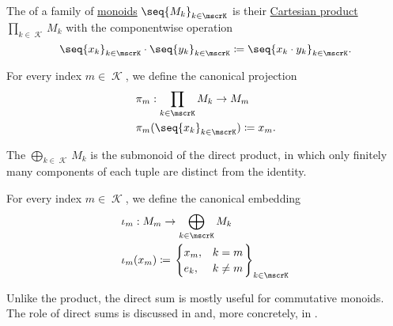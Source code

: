 \begin{definition}\label{def:monoid_direct_product}
  The  of a family of \hyperref[def:monoid]{monoids} \( \seq{ M_k }_{k \in \mscrK} \) is their \hyperref[def:cartesian_product]{Cartesian product} \( \prod_{k \in \mscrK} M_k \) with the componentwise operation
  \begin{equation*}
    \seq{ x_k }_{k \in \mscrK} \cdot \seq{ y_k }_{k \in \mscrK}
    \coloneqq
    \seq{ x_k \cdot y_k }_{k \in \mscrK}.
  \end{equation*}

  For every index \( m \in \mscrK \), we define the canonical projection
  \begin{equation*}
    \begin{aligned}
      &\pi_m: \prod_{k \in \mscrK} M_k \to M_m \\
      &\pi_m(\seq{ x_k }_{k \in \mscrK}) \coloneqq x_m.
    \end{aligned}
  \end{equation*}

  The  \( \bigoplus_{k \in \mscrK} M_k \) is the submonoid of the direct product, in which only finitely many components of each tuple are distinct from the identity.

  For every index \( m \in \mscrK \), we define the canonical embedding
  \begin{equation*}
    \begin{aligned}
       &\iota_m: M_m \to \bigoplus_{k \in \mscrK} M_k \\
       &\iota_m(x_m) \coloneqq
        \begin{rcases}
          \begin{cases}
            x_m, &k = m \\
            e_k, &k \neq m
          \end{cases}
        \end{rcases}_{k \in \mscrK}
    \end{aligned}
  \end{equation*}

  Unlike the product, the direct sum is mostly useful for commutative monoids. The role of direct sums is discussed in  and, more concretely, in .
\end{definition}

